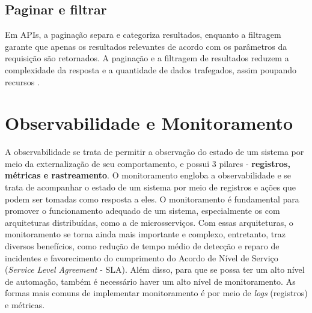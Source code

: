 
\subsection{Paginar e filtrar}
Em APIs, a paginação separa e categoriza resultados, enquanto a filtragem garante que apenas os resultados relevantes de acordo com os parâmetros da requisição são retornados. A paginação e a filtragem de resultados reduzem a complexidade da resposta e a quantidade de dados trafegados, assim poupando recursos \cite{api-design-restfulapi}.


\section{Observabilidade e Monitoramento}\label{observabilidade-monitoramento}
A observabilidade se trata de permitir a observação do estado de um sistema por meio da externalização de seu comportamento, e possui 3 pilares - \textbf{registros, métricas e rastreamento}. O monitoramento engloba a observabilidade e se trata de acompanhar o estado de um sistema por meio de registros e ações que podem ser tomadas como resposta a eles. O monitoramento é fundamental para promover o funcionamento adequado de um sistema, especialmente os com arquiteturas distribuídas, como a de microsserviços. Com essas arquiteturas, o monitoramento se torna ainda mais importante e complexo, entretanto, traz diversos benefícios, como redução de tempo médio de detecção e reparo de incidentes e favorecimento do cumprimento do Acordo de Nível de Serviço (\emph{Service Level Agreement} - SLA). Além disso, para que se possa ter um alto nível de automação, também é necessário haver um alto nível de monitoramento. As formas mais comuns de implementar monitoramento é por meio de \emph{logs} (registros) e métricas.

